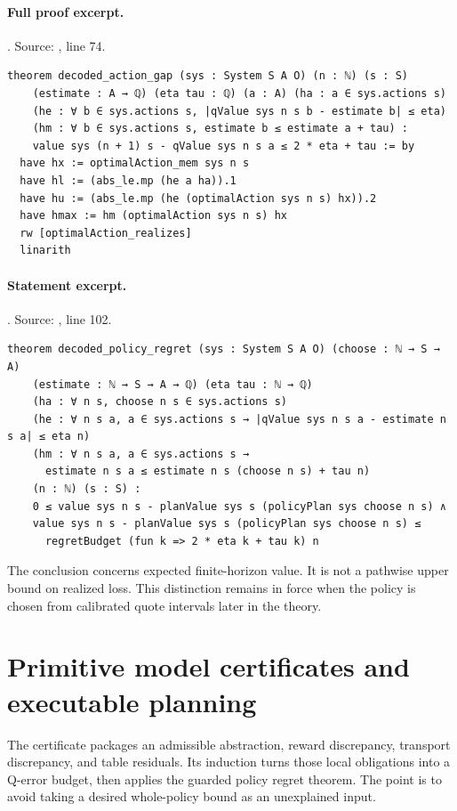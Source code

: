 \documentclass[11pt]{article}
\begin{document}
\paragraph{Full proof excerpt.}. Source: , line 74.
\begin{lstlisting}[style=AVOCSource]
theorem decoded_action_gap (sys : System S A O) (n : ℕ) (s : S)
    (estimate : A → ℚ) (eta tau : ℚ) (a : A) (ha : a ∈ sys.actions s)
    (he : ∀ b ∈ sys.actions s, |qValue sys n s b - estimate b| ≤ eta)
    (hm : ∀ b ∈ sys.actions s, estimate b ≤ estimate a + tau) :
    value sys (n + 1) s - qValue sys n s a ≤ 2 * eta + tau := by
  have hx := optimalAction_mem sys n s
  have hl := (abs_le.mp (he a ha)).1
  have hu := (abs_le.mp (he (optimalAction sys n s) hx)).2
  have hmax := hm (optimalAction sys n s) hx
  rw [optimalAction_realizes]
  linarith
\end{lstlisting}

\paragraph{Statement excerpt.}. Source: , line 102.
\begin{lstlisting}[style=AVOCSource]
theorem decoded_policy_regret (sys : System S A O) (choose : ℕ → S → A)
    (estimate : ℕ → S → A → ℚ) (eta tau : ℕ → ℚ)
    (ha : ∀ n s, choose n s ∈ sys.actions s)
    (he : ∀ n s a, a ∈ sys.actions s → |qValue sys n s a - estimate n s a| ≤ eta n)
    (hm : ∀ n s a, a ∈ sys.actions s →
      estimate n s a ≤ estimate n s (choose n s) + tau n)
    (n : ℕ) (s : S) :
    0 ≤ value sys n s - planValue sys s (policyPlan sys choose n s) ∧
    value sys n s - planValue sys s (policyPlan sys choose n s) ≤
      regretBudget (fun k => 2 * eta k + tau k) n
\end{lstlisting}


The conclusion concerns expected finite-horizon value. It is not a pathwise
upper bound on realized loss. This distinction remains in force when the
policy is chosen from calibrated quote intervals later in the theory.

\section{Primitive model certificates and executable planning}
The  certificate packages an admissible abstraction,
reward discrepancy, transport discrepancy, and table residuals. Its induction
turns those local obligations into a Q-error budget, then applies the guarded
policy regret theorem. The point is to avoid taking a desired whole-policy
bound as an unexplained input.
\end{document}
